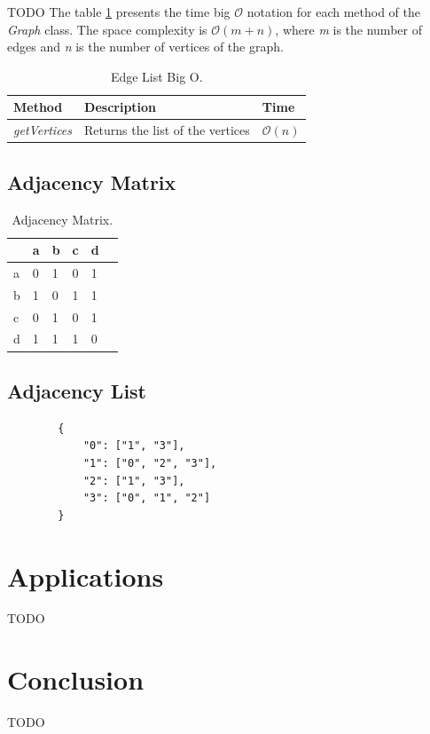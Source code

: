 \documentclass[a4paper]{article}
\begin{document}
    TODO The table \ref{tab:edge-list-o} presents the
    time big $\mathcal{O}$ notation for each method of the
    \emph{Graph} class.
    The space complexity is $\mathcal{O}(m+n)$, where
    \emph{m} is the number of edges and \emph{n} is the
    number of vertices of the graph.

    \begin{table}[H]
        \centering
        \caption{\label{tab:edge-list-o}Edge List Big O.}
        \vspace*{10pt}
        \begin{tabular}{ |l|l|l| }
            \hline
            Method & Description & Time \\
            \hline
            \emph{getVertices} &
                Returns the list of the vertices &
                $\mathcal{O}(n)$ \\
            \hline
        \end{tabular}
    \end{table}


    \subsection{Adjacency Matrix} \label{adjacency_matrix}

    \begin{table}[H]
        \centering
        \caption{\label{tab:adjacency-matrix}Adjacency Matrix.}
        \vspace*{10pt}
        \begin{tabular}{ l|l|l|l|l|l| }
                & a & b & c & d \\
            \hline
            a   & 0 & 1 & 0 & 1 \\
            b   & 1 & 0 & 1 & 1 \\
            c   & 0 & 1 & 0 & 1 \\
            d   & 1 & 1 & 1 & 0 \\
            \hline
        \end{tabular}
    \end{table}


    \subsection{Adjacency List} \label{adjacency_list}


    \begin{verbatim}
        {
            "0": ["1", "3"],
            "1": ["0", "2", "3"],
            "2": ["1", "3"],
            "3": ["0", "1", "2"]
        }

    \end{verbatim}


    \section{Applications}
    TODO


    \section*{Conclusion}
    TODO

    
    
\end{document}
